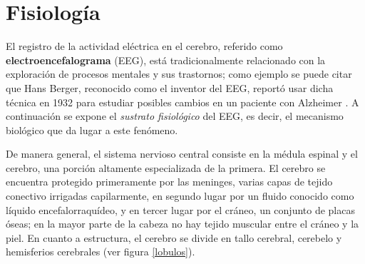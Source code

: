 %



\section{Fisiología}

El registro de la actividad eléctrica en el cerebro, referido como \textbf{electroencefalograma} 
(EEG), está tradicionalmente relacionado con la exploración de procesos mentales y sus trastornos; 
como ejemplo se puede citar que Hans Berger, reconocido como el inventor del EEG, reportó usar 
dicha técnica en 1932 para estudiar posibles cambios en un paciente con Alzheimer 
\cite{historia_eeg}.
%
A continuación se expone el \textit{sustrato fisiológico} del EEG, es decir, el mecanismo biológico 
que da lugar a este fenómeno.

De manera general, el sistema nervioso central consiste en la médula espinal y el cerebro, una 
porción altamente especializada de la primera. El cerebro se encuentra 
protegido primeramente por las meninges, varias capas de tejido conectivo irrigadas capilarmente,
en segundo lugar por un fluido conocido como líquido encefalorraquídeo, y en tercer lugar por el 
cráneo, un conjunto de placas óseas; en la mayor parte de la cabeza no hay tejido muscular entre
el cráneo y la piel.
%
En cuanto a estructura, el cerebro se divide en tallo cerebral, cerebelo y hemisferios cerebrales 
(ver figura \ref{lobulos}). 

